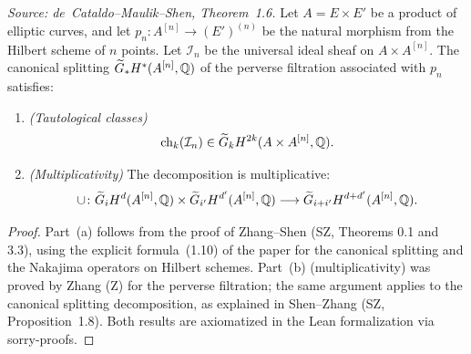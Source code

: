 \begin{theorem}
  \label{thm:taut_Hilb}
  \textit{Source: de~Cataldo--Maulik--Shen, Theorem~1.6.}
  Let \(A = E \times E'\) be a product of elliptic curves, and let
  \(p_n \colon A^{[n]} \to (E')^{(n)}\) be the natural morphism from the
  Hilbert scheme of \(n\) points.  Let \(\mathcal{I}_n\) be the universal
  ideal sheaf on \(A \times A^{[n]}\).  The canonical splitting
  \(\widetilde{G}_* H^*(A^{[n]},\mathbb{Q})\) of the perverse filtration
  associated with \(p_n\) satisfies:
  \begin{enumerate}
    \item[(a)] \emph{(Tautological classes)}
      \[
        \operatorname{ch}_k(\mathcal{I}_n) \in \widetilde{G}_k H^{2k}(A \times A^{[n]},\mathbb{Q}).
      \]
    \item[(b)] \emph{(Multiplicativity)} The decomposition is multiplicative:
      \[
        \cup \colon \widetilde{G}_i H^d(A^{[n]},\mathbb{Q})
          \times \widetilde{G}_{i'} H^{d'}(A^{[n]},\mathbb{Q})
          \longrightarrow \widetilde{G}_{i+i'} H^{d+d'}(A^{[n]},\mathbb{Q}).
      \]
  \end{enumerate}
\end{theorem}

\begin{proof}
  \uses{}
  Part~(a) follows from the proof of Zhang--Shen (SZ, Theorems 0.1 and 3.3),
  using the explicit formula~(1.10) of the paper for the canonical splitting
  and the Nakajima operators on Hilbert schemes.
  Part~(b) (multiplicativity) was proved by Zhang (Z) for the perverse
  filtration; the same argument applies to the canonical splitting decomposition,
  as explained in Shen--Zhang (SZ, Proposition~1.8).
  Both results are axiomatized in the Lean formalization via sorry-proofs.
\end{proof}


